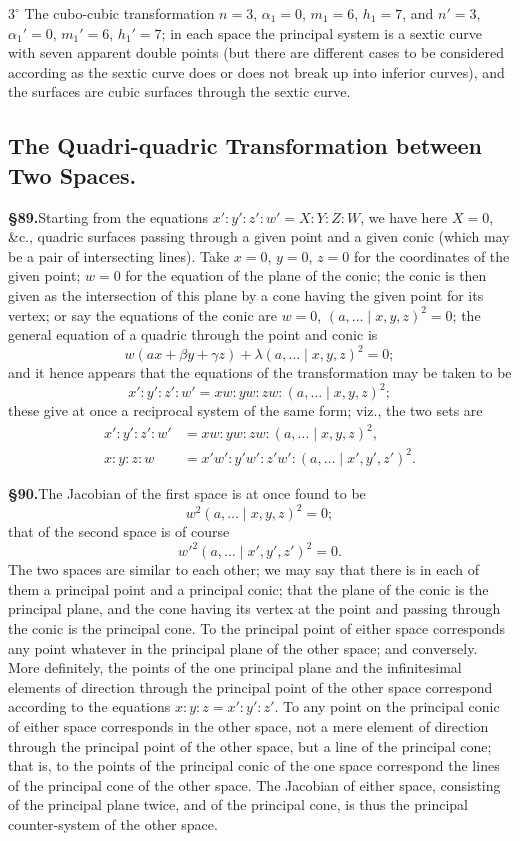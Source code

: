 \documentclass[11pt,a4paper]{article}
\begin{document}
$3^{\circ}$ The cubo-cubic transformation $n = 3$, $\alpha_1 = 0$, $m_1 = 6$, $h_1 = 7$, and $n' = 3$, $\alpha_1' = 0$, $m_1' = 6$, $h_1' = 7$; in each space the principal system is a sextic curve with seven apparent double points (but there are different cases to be considered according as the sextic curve does or does not break up into inferior curves), and the surfaces are cubic surfaces through the sextic curve.

\subsection*{The Quadri-quadric Transformation between Two Spaces.}

\textbf{\S 89.}\quad Starting from the equations $x' : y' : z' : w' = X : Y : Z : W$, we have here $X = 0$, \&c., quadric surfaces passing through a given point and a given conic (which may be a pair of intersecting lines). Take $x = 0$, $y = 0$, $z = 0$ for the coordinates of the given point; $w = 0$ for the equation of the plane of the conic; the conic is then given as the intersection of this plane by a cone having the given point for its vertex; or say the equations of the conic are $w = 0$, $(a, \ldots \mid x, y, z)^2 = 0$; the general equation of a quadric through the point and conic is
\[
w(ax + \beta y + \gamma z) + \lambda (a, \ldots \mid x, y, z)^2 = 0;
\]
and it hence appears that the equations of the transformation may be taken to be
\[
x' : y' : z' : w' = xw : yw : zw : (a, \ldots \mid x, y, z)^2;
\]
these give at once a reciprocal system of the same form; viz., the two sets are
\begin{align*}
x' : y' : z' : w' &= xw : yw : zw : (a, \ldots \mid x, y, z)^2, \\
x : y : z : w &= x'w' : y'w' : z'w' : (a, \ldots \mid x', y', z')^2.
\end{align*}

\textbf{\S 90.}\quad The Jacobian of the first space is at once found to be
\[
w^2(a, \ldots \mid x, y, z)^2 = 0;
\]
that of the second space is of course
\[
w'^2(a, \ldots \mid x', y', z')^2 = 0.
\]
The two spaces are similar to each other; we may say that there is in each of them a principal point and a principal conic; that the plane of the conic is the principal plane, and the cone having its vertex at the point and passing through the conic is the principal cone. To the principal point of either space corresponds any point whatever in the principal plane of the other space; and conversely. More definitely, the points of the one principal plane and the infinitesimal elements of direction through the principal point of the other space correspond according to the equations $x : y : z = x' : y' : z'$. To any point on the principal conic of either space corresponds in the other space, not a mere element of direction through the principal point of the other space, but a line of the principal cone; that is, to the points of the principal conic of the one space correspond the lines of the principal cone of the other space. The Jacobian of either space, consisting of the principal plane twice, and of the principal cone, is thus the principal counter-system of the other space.
\end{document}
